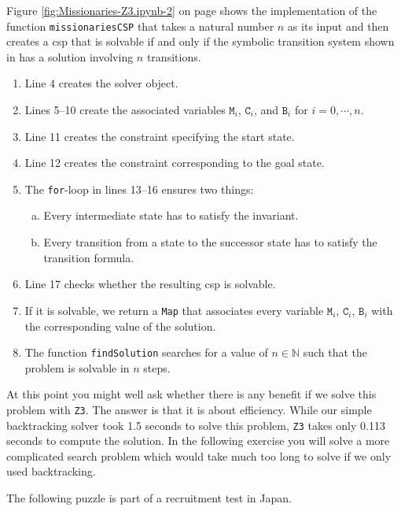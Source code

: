 Figure \ref{fig:Missionaries-Z3.ipynb-2} on page \pageref{fig:Missionaries-Z3.ipynb-2} shows the implementation
of the function \texttt{missionariesCSP} that takes a natural number $n$ as its input and then creates a
\Gls{csp} that is solvable if and only if the symbolic transition system shown in
 has a solution involving $n$ transitions.
\begin{enumerate}
\item Line 4 creates the solver object.
\item Lines 5--10 create the associated variables $\mathtt{M}_i$, $\mathtt{C}_i$, and $\mathtt{B}_i$
      for $i=0, \cdots, n$.
\item Line 11 creates the constraint specifying the start state.    
\item Line 12 creates the constraint corresponding to the goal state.
\item The \texttt{for}-loop in lines 13--16 ensures two things:
  \begin{enumerate}[(a)]
  \item Every intermediate state has to satisfy the invariant.
  \item Every transition from a state to the successor state has to satisfy the transition formula.
  \end{enumerate}
\item Line 17 checks whether the resulting \Gls{csp} is solvable.
\item If it is solvable, we return a \texttt{Map} that associates every variable $\texttt{M}_i$,  $\texttt{C}_i$,
      $\texttt{B}_i$ with the corresponding value of the solution.
\item The function \texttt{findSolution} searches for a value of $n \in \mathbb{N}$ such that the problem is
      solvable in $n$ steps.
\end{enumerate}
At this point you might well ask whether there is any benefit if we solve this problem with \texttt{Z3}.  The
answer is that it is about efficiency.  While our simple backtracking solver took 1.5 seconds to solve this
problem, \texttt{Z3} takes only 0.113 seconds to compute the solution.  In the following exercise you will
solve a more complicated search problem which would take much too long to solve if we only used backtracking.


\exerciseEng
The following puzzle is part of a recruitment test in Japan.

